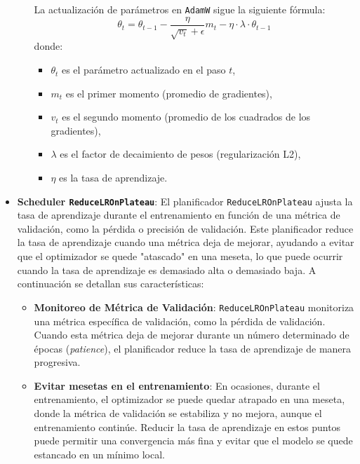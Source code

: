 \begin{itemize}
\begin{itemize}
        La actualización de parámetros en \texttt{AdamW} sigue la siguiente fórmula:
        \[
        \theta_t = \theta_{t-1} - \frac{\eta}{\sqrt{v_t} + \epsilon} m_t - \eta \cdot \lambda \cdot \theta_{t-1}
        \]
        donde:
        \begin{itemize}
            \item \( \theta_t \) es el parámetro actualizado en el paso \( t \),
            \item \( m_t \) es el primer momento (promedio de gradientes),
            \item \( v_t \) es el segundo momento (promedio de los cuadrados de los gradientes),
            \item \( \lambda \) es el factor de decaimiento de pesos (regularización L2),
            \item \( \eta \) es la tasa de aprendizaje.
        \end{itemize}
    \end{itemize}

    \item \textbf{Scheduler \texttt{ReduceLROnPlateau}}:
    El planificador \texttt{ReduceLROnPlateau} ajusta la tasa de aprendizaje durante el entrenamiento en función de una métrica de validación, como la pérdida o precisión de validación. Este planificador reduce la tasa de aprendizaje cuando una métrica deja de mejorar, ayudando a evitar que el optimizador se quede "atascado" en una meseta, lo que puede ocurrir cuando la tasa de aprendizaje es demasiado alta o demasiado baja. A continuación se detallan sus características:
    
    \begin{itemize}
        \item \textbf{Monitoreo de Métrica de Validación}: 
        \texttt{ReduceLROnPlateau} monitoriza una métrica específica de validación, como la pérdida de validación. Cuando esta métrica deja de mejorar durante un número determinado de épocas (\textit{patience}), el planificador reduce la tasa de aprendizaje de manera progresiva.

        \item \textbf{Evitar mesetas en el entrenamiento}: 
        En ocasiones, durante el entrenamiento, el optimizador se puede quedar atrapado en una meseta, donde la métrica de validación se estabiliza y no mejora, aunque el entrenamiento continúe. Reducir la tasa de aprendizaje en estos puntos puede permitir una convergencia más fina y evitar que el modelo se quede estancado en un mínimo local.


\end{itemize}
\end{itemize}
